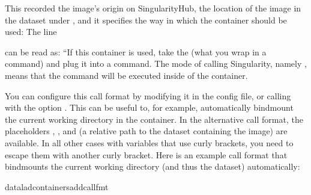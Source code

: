 \sphinxAtStartPar
This recorded the image’s origin on Singularity\sphinxhyphen{}Hub, the location of the
image in the dataset under , and it
specifies the way in which the container should be used: The line

\begin{sphinxVerbatim}[commandchars=\\\{\}]
\end{sphinxVerbatim}

\sphinxAtStartPar
can be read as: “If this container is used, take the  (what you wrap in a
 command) and plug it into a
 command. The mode of calling Singularity,
namely , means that the command will be executed inside of the container.

\sphinxAtStartPar
You can configure this call format by modifying it in the config file, or calling  with the option .
This can be useful to, for example, automatically bind\sphinxhyphen{}mount the current working directory in the container.
In the alternative call format, the placeholders , , and  (a relative path to the dataset containing the image) are available.
In all other cases with variables that use curly brackets, you need to escape them with another curly bracket.
Here is an example call format that bind\sphinxhyphen{}mounts the current working directory (and thus the dataset) automatically:

\begin{sphinxVerbatim}[commandchars=\\\{\}]
dataladcontainers\PYGZhy{}add\PYGZhy{}\PYGZhy{}call\PYGZhy{}fmt
\end{sphinxVerbatim}

